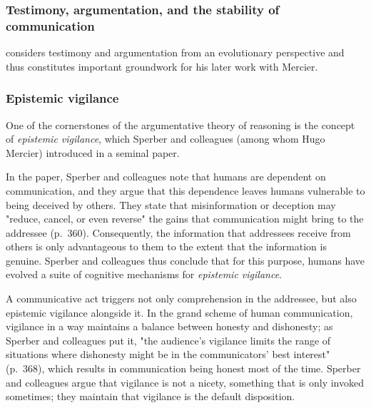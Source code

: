 \subsubsection{Testimony, argumentation, and the stability of communication}

\citet{Sperber01} considers testimony and argumentation from an evolutionary perspective and thus constitutes important groundwork for his later work with Mercier.


\subsubsection{Epistemic vigilance}

One of the cornerstones of the argumentative theory of reasoning is the concept of \emph{epistemic vigilance}, which Sperber and colleagues (among whom Hugo Mercier) introduced in a seminal \citeyear{Sperber10} paper.

In the paper, Sperber and colleagues note that humans are dependent on communication, and they argue that this dependence leaves humans vulnerable to being deceived by others.
They state that misinformation or deception may "reduce, cancel, or even reverse" the gains that communication might bring to the addressee (p.~360).
Consequently, the information that addressees receive from others is only advantageous to them to the extent that the information is genuine.
Sperber and colleagues thus conclude that for this purpose, humans have evolved a suite of cognitive mechanisms for \emph{epistemic vigilance}.

A communicative act triggers not only comprehension in the addressee, but also epistemic vigilance alongside it.
In the grand scheme of human communication, vigilance in a way maintains a balance between honesty and dishonesty; as Sperber and colleagues put it, "the audience's vigilance limits the range of situations where dishonesty might be in the communicators' best interest" (p.~368), which results in communication being honest most of the time.
Sperber and colleagues argue that vigilance is not a nicety, something that is only invoked sometimes; they maintain that vigilance is the default disposition.

